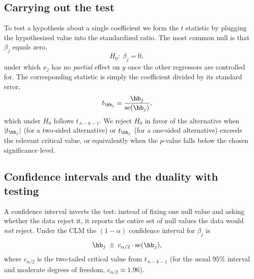 \subsection{Carrying out the test}

To test a hypothesis about a single coefficient we form the $t$ statistic by plugging the hypothesized value into the standardized ratio. The most common null is that $\beta_j$ equals zero,
\[
H_0:\ \beta_j = 0,
\]
under which $x_j$ has no \emph{partial} effect on $y$ once the other regressors are controlled for. The corresponding statistic is simply the coefficient divided by its standard error,
\[
t_{\hb_j} = \frac{\hb_j}{\operatorname{se}(\hb_j)},
\]
which under $H_0$ follows $t_{\,n-k-1}$. We reject $H_0$ in favor of the alternative when $|t_{\hb_j}|$ (for a two-sided alternative) or $t_{\hb_j}$ (for a one-sided alternative) exceeds the relevant critical value, or equivalently when the $p$-value falls below the chosen significance level.


\subsection{Confidence intervals and the duality with testing}

A confidence interval inverts the test: instead of fixing one null value and asking whether the data reject it, it reports the entire set of null values the data would \emph{not} reject. Under the CLM the $(1-\alpha)$ confidence interval for $\beta_j$ is
\[
\hb_j \;\pm\; c_{\alpha/2}\cdot \operatorname{se}(\hb_j),
\]
where $c_{\alpha/2}$ is the two-tailed critical value from $t_{\,n-k-1}$ (for the usual $95\%$ interval and moderate degrees of freedom, $c_{\alpha/2}\approx 1.96$).

